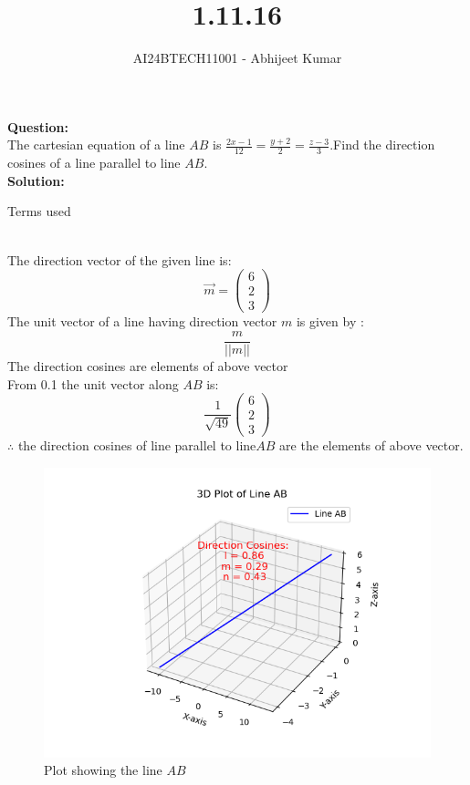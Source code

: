 \documentclass[journal]{IEEEtran}
\begin{document}

\vspace{3cm}

\title{1.11.16}
\author{AI24BTECH11001 - Abhijeet Kumar}
{\let\newpage\relax\maketitle}

\renewcommand{\thefigure}{\theenumi}
\renewcommand{\thetable}{\theenumi}
\setlength{\intextsep}{10pt} %


\renewcommand{\thetable}{\theenumi}


\textbf{Question:}\\
The cartesian equation of a line $AB$ is $\frac{2x-1}{12}=\frac{y+2}{2}=\frac{z-3}{3}$.Find the direction cosines of a line parallel to line $AB$.
\\
\textbf{Solution: }\\
\begin{table}[h!]
    \renewcommand{\thetable}{1}
    \centering
    
    \caption{Terms used}
    \label{TABLE 1:}
\end{table}\\
The direction vector of the given line is$\colon$
\begin{equation*}
    \vec{m}=\begin{pmatrix}
        6\\
        2\\
        3
    \end{pmatrix}
\end{equation*}
The unit vector of a line having direction vector $m$ is given by $\colon$
\begin{equation}
    \frac{m}{||m||}
\end{equation}
The direction cosines are elements of above vector  \\
From 0.1 the unit vector along $AB$ is$\colon$\\
\begin{equation}
\frac{1}{\sqrt{49}}\begin{pmatrix}
    6\\
    2\\
    3
\end{pmatrix}
\end{equation}
$\therefore$ the direction cosines of line parallel to line$AB$ are the elements of above vector.
 \begin{figure}[h!]
   \centering
   \includegraphics[width=0.7\linewidth]{figs/figure1.png}
   \caption{Plot showing the line $AB$}
   \label{stemplot}
\end{figure}
\end{document}
